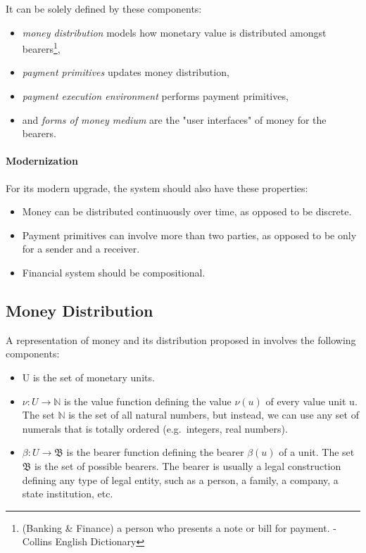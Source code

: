 \documentclass[a4paper,10pt]{report}
\begin{document}
It can be solely defined by these components:

\begin{itemize}
\item \textit{money distribution} models how monetary value is distributed amongst bearers\footnote{(Banking \& Finance)
a person who presents a note or bill for payment. - Collins English Dictionary},
\item \textit{payment primitives} updates money distribution,
\item \textit{payment execution environment} performs payment primitives,
\item and \textit{forms of money medium} are the "user interfaces" of money for the bearers.
\end{itemize}

\paragraph{Modernization}

For its modern upgrade, the system should also have these properties:

\begin{itemize}
\item Money can be distributed continuously over time, as opposed to be discrete.
\item Payment primitives can involve more than two parties, as opposed to be only for a sender and a receiver.
\item Financial system should be compositional.
\end{itemize}


\subsection{Money Distribution}

A representation of money and its distribution proposed in \cite{buldas2021unifying} involves the following components:

\begin{itemize}
\item U is the set of monetary units.
\item $\nu : U \rightarrow \mathbb{N}$ is the value function defining the value $\nu(u)$ of every value unit u. The set
    $\mathbb{N}$ is the set of all natural numbers, but instead, we can use any set of numerals that is totally ordered
    (e.g.\ integers, real numbers).
\item $\beta : U \rightarrow \mathfrak{B}$ is the bearer function defining the bearer $\beta(u)$ of a unit. The set
    $\mathfrak{B}$ is the set of possible bearers. The bearer is usually a legal construction defining any type of legal
    entity, such as a person, a family, a company, a state institution, etc.
\end{itemize}
\end{document}

